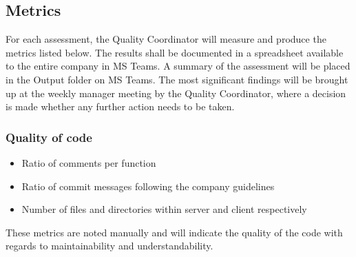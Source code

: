
\subsection{Metrics}
For each assessment, the Quality Coordinator will measure and produce the metrics listed below. The results shall be documented in a spreadsheet available to the entire company in MS Teams. A summary of the assessment will be placed in the Output folder on MS Teams. The most significant findings will be brought up at the weekly manager meeting by the Quality Coordinator, where a decision is made whether any further action needs to be taken.

\subsubsection{Quality of code}
\begin{itemize}
\item Ratio of comments per function
\item Ratio of commit messages following the company guidelines
\item Number of files and directories within server and client respectively
\end{itemize}
These metrics are noted manually and will indicate the quality of the code with regards to maintainability and understandability.

